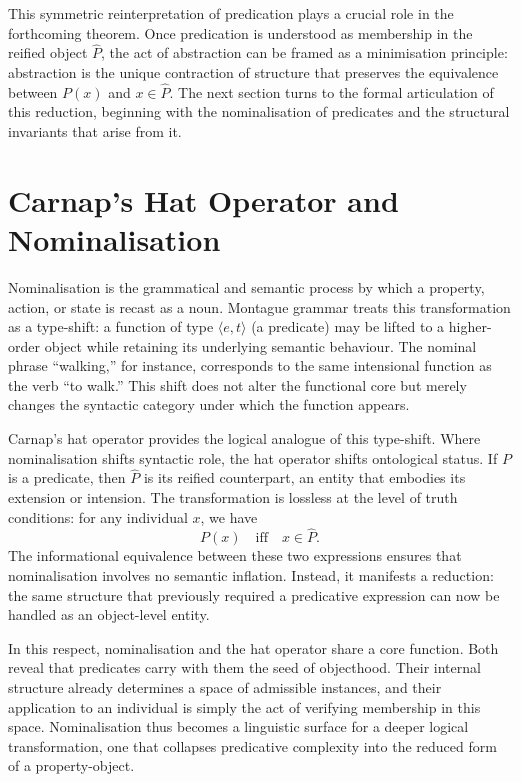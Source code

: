 \documentclass[12pt,letterpaper]{article}
\begin{document}
This symmetric reinterpretation of predication plays a crucial role in the forthcoming theorem. Once predication is understood as membership in the reified object $\hat{P}$, the act of abstraction can be framed as a minimisation principle: abstraction is the unique contraction of structure that preserves the equivalence between $P(x)$ and $x \in \hat{P}$. The next section turns to the formal articulation of this reduction, beginning with the nominalisation of predicates and the structural invariants that arise from it.

\section{Carnap’s Hat Operator and Nominalisation}

Nominalisation is the grammatical and semantic process by which a property, action, or state is recast as a noun. Montague grammar treats this transformation as a type-shift: a function of type $\langle e, t \rangle$ (a predicate) may be lifted to a higher-order object while retaining its underlying semantic behaviour. The nominal phrase “walking,” for instance, corresponds to the same intensional function as the verb “to walk.” This shift does not alter the functional core but merely changes the syntactic category under which the function appears.

Carnap’s hat operator provides the logical analogue of this type-shift. Where nominalisation shifts syntactic role, the hat operator shifts ontological status. If $P$ is a predicate, then $\hat{P}$ is its reified counterpart, an entity that embodies its extension or intension. The transformation is lossless at the level of truth conditions: for any individual $x$, we have
\[
P(x) \quad \text{iff} \quad x \in \hat{P}.
\]
The informational equivalence between these two expressions ensures that nominalisation involves no semantic inflation. Instead, it manifests a reduction: the same structure that previously required a predicative expression can now be handled as an object-level entity.

In this respect, nominalisation and the hat operator share a core function. Both reveal that predicates carry with them the seed of objecthood. Their internal structure already determines a space of admissible instances, and their application to an individual is simply the act of verifying membership in this space. Nominalisation thus becomes a linguistic surface for a deeper logical transformation, one that collapses predicative complexity into the reduced form of a property-object.
\end{document}
